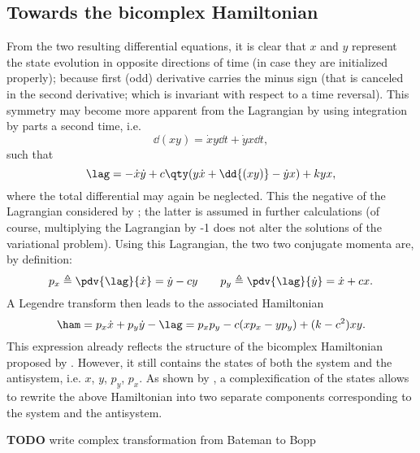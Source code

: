 \subsection{Towards the bicomplex Hamiltonian}
From the two resulting differential equations, it is clear that $x$ and $y$ represent the state evolution in opposite directions of time (in case they are initialized properly); because first (odd) derivative carries the minus sign (that is canceled in the second derivative; which is invariant with respect to a time reversal). This symmetry may become more apparent from the Lagrangian by using integration by parts a second time, i.e.  
$$ \dd{(xy)} = \dot{x}y\dd{t} + \dot{y}x\dd{t}, $$
such that
$$ \lag = -\dot{x}\dot{y} + c\qty(y\dot{x} + \dd{(xy)} - \dot{y}x) + kyx, $$
where the total differential may again be neglected. This the negative of the Lagrangian considered by \citet{Dekker1981}; the latter is assumed in further calculations (of course, multiplying the Lagrangian by -1 does not alter the solutions of the variational problem). Using this Lagrangian, the two two conjugate momenta are, by definition:
$$ p_x \triangleq \pdv{\lag}{\dot{x}} = \dot{y} - cy\qquad p_y \triangleq \pdv{\lag}{\dot{y}} = \dot{x} + cx.$$
A Legendre transform then leads to the associated Hamiltonian
$$\ham = p_x \dot{x} + p_y \dot{y} - \lag = p_xp_y - c(xp_x - yp_y) + (k - c^2)xy.$$
This expression already reflects the structure of the bicomplex Hamiltonian proposed by \citet{Hutters2020}. However, it still contains the states of both the system and the antisystem, i.e. $x$, $y$, $p_y$, $p_x$. As shown by \citet{Bopp1974}, a complexification of the states allows to rewrite the above Hamiltonian into two separate components corresponding to the system and the antisystem.

\textbf{TODO} write complex transformation from Bateman to Bopp

